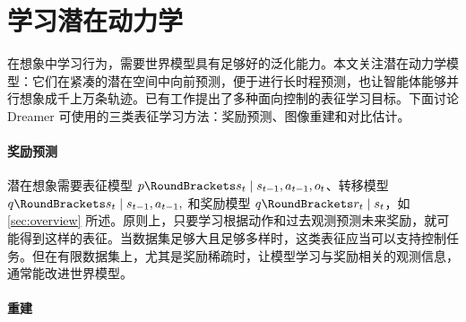 \vspace*{-.8ex}
\section{学习潜在动力学}
\label{sec:dynamics}
\vspace*{-.8ex}





在想象中学习行为，需要世界模型具有足够好的泛化能力。本文关注潜在动力学模型：它们在紧凑的潜在空间中向前预测，便于进行长时程预测，也让智能体能够并行想象成千上万条轨迹。已有工作提出了多种面向控制的表征学习目标\citep{watter2015e2c,jaderberg2016unreal,oord2018cpc,eslami2018gqn}。下面讨论 Dreamer 可使用的三类表征学习方法：奖励预测、图像重建和对比估计。

\paragraph{奖励预测}

潜在想象需要表征模型 $\p(s_t|s_{t-1},a_{t-1},o_t)$、转移模型 $\q(s_t|s_{t-1},a_{t-1},)$ 和奖励模型 $\q(r_t|s_t)$，如 \cref{sec:overview} 所述。原则上，只要学习根据动作和过去观测预测未来奖励，就可能得到这样的表征\citep{oh2017vpn,gelada2019deepmdp,schrittwieser2019muzero}。当数据集足够大且足够多样时，这类表征应当可以支持控制任务。但在有限数据集上，尤其是奖励稀疏时，让模型学习与奖励相关的观测信息，通常能改进世界模型\citep{jaderberg2016unreal,gregor2019beliefstate}。

\pagebreak

\paragraph{重建}

